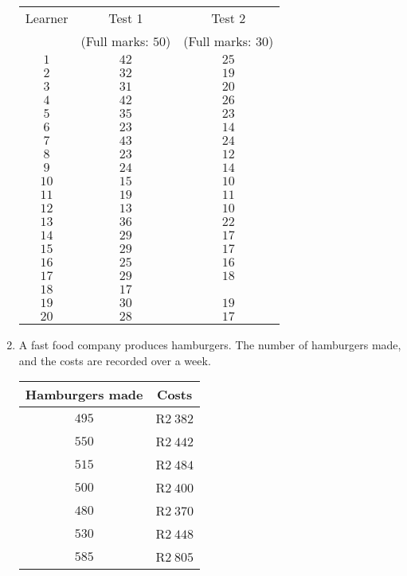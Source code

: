 \begin{eocexercises}{}
\begin{enumerate}
\begin{tabular}{|c|c|c|}
\hline
Learner & Test 1 & Test 2 \\
& (Full marks: $50$) & (Full marks: $30$) \\ \hline
$1$ & $42$ & $25$ \\ \hline
$2$ & $32$ & $19$ \\ \hline
$3$ & $31$ & $20$ \\ \hline
$4$ & $42$ & $26$ \\ \hline
$5$ & $35$ & $23$ \\ \hline
$6$ & $23$ & $14$ \\ \hline
$7$ & $43$ & $24$ \\ \hline
$8$ & $23$ & $12$ \\ \hline
$9$ & $24$ & $14$ \\ \hline
$10$ & $15$ & $10$ \\ \hline
$11$ & $19$ & $11$ \\ \hline
$12$ & $13$ & $10$ \\ \hline
$13$ & $36$ & $22$ \\ \hline
$14$ & $29$ & $17$ \\ \hline
$15$ & $29$ & $17$ \\ \hline
$16$ & $25$ & $16$ \\ \hline
$17$ & $29$ & $18$ \\ \hline
$18$ & $17$ & \\ \hline
$19$ & $30$ & $19$ \\ \hline
$20$ & $28$ & $17$ \\
\hline
\end{tabular}

\item
A fast food company produces hamburgers. The number of hamburgers made, and the costs are recorded over a week.\\

\begin{tabular}{|c|c|}
\hline
Hamburgers made & Costs \\
\hline
$495$ & R$2~382$ \\ \hline
$550$ & R$2~442$ \\ \hline
$515$ & R$2~484$ \\ \hline
$500$ & R$2~400$ \\ \hline
$480$ & R$2~370$ \\ \hline
$530$ & R$2~448$ \\ \hline
$585$ & R$2~805$ \\ \hline
\end{tabular}



\end{enumerate}
\end{eocexercises}

